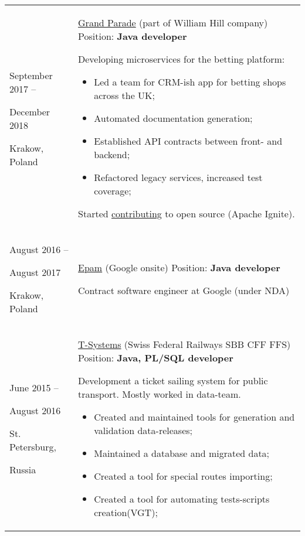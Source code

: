 \documentclass{article}
\begin{document}
\begin{longtable}{p{0.00in}p{0.00in}p{0.0in}p{0.00in}p{0.00in}}
\multicolumn{2}{p{\dimexpr1.00in+2\tabcolsep\relax}}{September 2017 -- \par December 2018 \par Krakow, Poland} &
\multicolumn{3}{p{\dimexpr5.85in+4\tabcolsep\relax}}{\href{https://grandparade.co.uk/}{Grand Parade} (part of William Hill company)
Position: \textbf{Java developer} \par
Developing microservices for the betting platform:
\begin{itemize}
    \item Led a team for CRM-ish app for betting shops across the UK;
    \item Automated documentation generation;
    \item Established API contracts between front- and backend;
    \item Refactored legacy services, increased test coverage;
\end{itemize}
    Started \href{https://github.com/apache/ignite/commits?author=dehasi}{contributing} to open source (Apache Ignite).
\par} \\

\multicolumn{2}{p{\dimexpr1.00in+2\tabcolsep\relax}}{August 2016 -- \par August 2017 \par Krakow, Poland} &
\multicolumn{3}{p{\dimexpr5.85in+4\tabcolsep\relax}}{\href{https://www.epam.com/}{Epam} (Google onsite)
Position: \textbf{Java developer} \par \par
Contract software engineer at Google (under NDA)
\par}\\

\multicolumn{2}{p{\dimexpr1.00in+2\tabcolsep\relax}}{June 2015 -- \par August 2016 \par St. Petersburg, \par Russia} &
\multicolumn{3}{p{\dimexpr5.85in+4\tabcolsep\relax}}{\href{https://www.t-systems.com/ru/en}{T-Systems} (Swiss Federal Railways SBB CFF FFS)
Position: \textbf{Java, PL/SQL developer} \par
Development a ticket sailing system for public transport. Mostly worked in data-team.
\begin{itemize}
    \item Created and maintained tools for generation and validation data-releases;
    \item Maintained a database and migrated data;
    \item Created a tool for special routes importing;
    \item Created a tool for automating tests-scripts creation(VGT);
\end{itemize}
\par} \\


\end{longtable}
\end{document}
